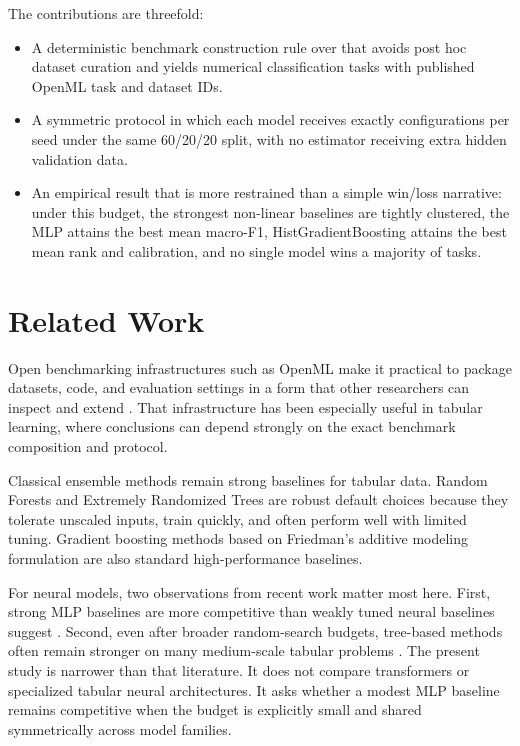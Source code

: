 \documentclass{ieeeaccess}
\begin{document}
The contributions are threefold:
\begin{itemize}
\item A deterministic benchmark construction rule over \BenchmarkSuiteName{} that avoids post hoc dataset curation and yields \DatasetCount{} numerical classification tasks with published OpenML task and dataset IDs.
\item A symmetric protocol in which each model receives exactly \SearchConfigsPerModel{} configurations per seed under the same 60/20/20 split, with no estimator receiving extra hidden validation data.
\item An empirical result that is more restrained than a simple win/loss narrative: under this budget, the strongest non-linear baselines are tightly clustered, the MLP attains the best mean macro-F1, HistGradientBoosting attains the best mean rank and calibration, and no single model wins a majority of tasks.
\end{itemize}

\section{Related Work}
Open benchmarking infrastructures such as OpenML make it practical to package datasets, code, and evaluation settings in a form that other researchers can inspect and extend \cite{vanschoren2014}. That infrastructure has been especially useful in tabular learning, where conclusions can depend strongly on the exact benchmark composition and protocol.

Classical ensemble methods remain strong baselines for tabular data. Random Forests \cite{breiman2001} and Extremely Randomized Trees \cite{geurts2006} are robust default choices because they tolerate unscaled inputs, train quickly, and often perform well with limited tuning. Gradient boosting methods based on Friedman's additive modeling formulation \cite{friedman2001} are also standard high-performance baselines.

For neural models, two observations from recent work matter most here. First, strong MLP baselines are more competitive than weakly tuned neural baselines suggest \cite{gorishniy2021}. Second, even after broader random-search budgets, tree-based methods often remain stronger on many medium-scale tabular problems \cite{grinsztajn2022}. The present study is narrower than that literature. It does not compare transformers or specialized tabular neural architectures. It asks whether a modest MLP baseline remains competitive when the budget is explicitly small and shared symmetrically across model families.
\end{document}
